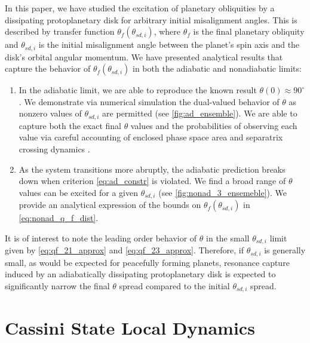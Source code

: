 \documentclass[
        fleqn,
        usenatbib,
        referee,
    ]{mnras}
\newcommand*{\p}[1]{\left(#1\right)}
\begin{document}
In this paper, we have studied the excitation of planetary obliquities by a
dissipating protoplanetary disk for arbitrary initial misalignment angles. This
is described by transfer function $\theta_f\p{\theta_{sd, i}}$, where $\theta_f$
is the final planetary obliquity and $\theta_{sd, i}$ is the initial
misalignment angle between the planet's spin axis and the disk's orbital angular
momentum. We have presented analytical results that capture the behavior of
$\theta_f\p{\theta_{sd, i}}$ in both the adiabatic and nonadiabatic limits:
\begin{enumerate}
    \item In the adiabatic limit, we are able to reproduce the known result
        $\theta(0) \approx 90^\circ$ \citep{millholland_disk}. We demonstrate
        via numerical simulation the dual-valued behavior of $\theta$ as nonzero
        values of $\theta_{sd, i}$ are permitted (see
        \autoref{fig:ad_ensemble}). We are able to capture both the exact final
        $\theta$ values and the probabilities of observing each value via
        careful accounting of enclosed phase space area and separatrix crossing
        dynamics \citep{henrard1982,henrard1987}.

    \item As the system transitions more abruptly, the adiabatic prediction
        breaks down when criterion \autoref{eq:ad_constr} is violated. We find a
        broad range of $\theta$ values can be excited for a given $\theta_{sd,
        i}$ (see \autoref{fig:nonad_3_ensemeble}). We provide an analytical
        expression of the bounds on $\theta_f\p{\theta_{sd, i}}$ in
        \autoref{eq:nonad_q_f_dist}.
\end{enumerate}

It is of interest to note the leading order behavior of $\theta$ in the
small $\theta_{sd, i}$ limit given by \autoref{eq:qf_21_approx} and
\autoref{eq:qf_23_approx}. Therefore, if $\theta_{sd, i}$ is generally small, as
would be expected for peacefully forming planets, resonance capture induced by
an adiabatically dissipating protoplanetary disk is expected to significantly
narrow the final $\theta$ spread compared to the initial $\theta_{sd, i}$
spread.




\appendix

\section{Cassini State Local Dynamics}\label{s:local_dynamics}
\end{document}
